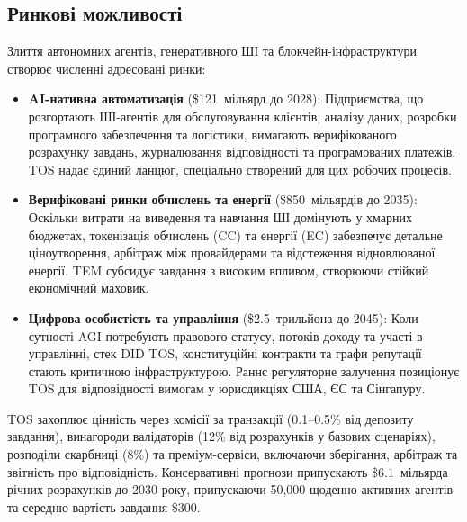 \documentclass[11pt]{article}
\begin{document}
\subsection{Ринкові можливості}
Злиття автономних агентів, генеративного ШІ та блокчейн-інфраструктури створює численні адресовані ринки:
\begin{itemize}[noitemsep]
  \item \textbf{AI-нативна автоматизація} (\$121~мільярд до 2028): Підприємства, що розгортають ШІ-агентів для обслуговування клієнтів, аналізу даних, розробки програмного забезпечення та логістики, вимагають верифікованого розрахунку завдань, журналювання відповідності та програмованих платежів. TOS надає єдиний ланцюг, спеціально створений для цих робочих процесів.
  \item \textbf{Верифіковані ринки обчислень та енергії} (\$850~мільярдів до 2035): Оскільки витрати на виведення та навчання ШІ домінують у хмарних бюджетах, токенізація обчислень (CC) та енергії (EC) забезпечує детальне ціноутворення, арбітраж між провайдерами та відстеження відновлюваної енергії. TEM субсидує завдання з високим впливом, створюючи стійкий економічний маховик.
  \item \textbf{Цифрова особистість та управління} (\$2.5~трильйона до 2045): Коли сутності AGI потребують правового статусу, потоків доходу та участі в управлінні, стек DID TOS, конституційні контракти та графи репутації стають критичною інфраструктурою. Раннє регуляторне залучення позиціонує TOS для відповідності вимогам у юрисдикціях США, ЄС та Сінгапуру.
\end{itemize}

TOS захоплює цінність через комісії за транзакції (0.1--0.5\% від депозиту завдання), винагороди валідаторів (12\% від розрахунків у базових сценаріях), розподіли скарбниці (8\%) та преміум-сервіси, включаючи зберігання, арбітраж та звітність про відповідність. Консервативні прогнози припускають \$6.1~мільярда річних розрахунків до 2030 року, припускаючи 50,000 щоденно активних агентів та середню вартість завдання \$300.
\end{document}
